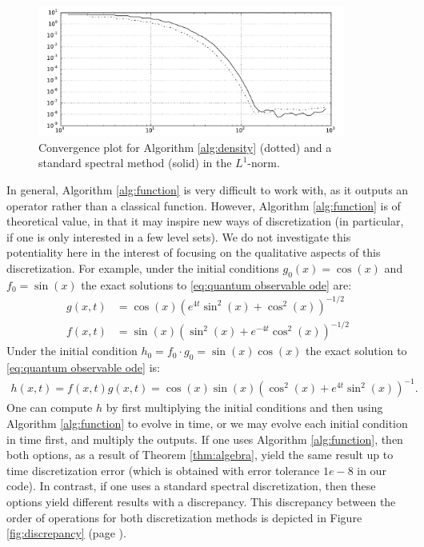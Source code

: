 \documentclass[final,leqno]{siamart}
\begin{document}
\begin{figure}[p]
	\hspace*{-1.2cm}
	\centering
	\includegraphics[width=0.9\textwidth]{./images/convergence_plot.pdf}
	\caption{Convergence plot for Algorithm \ref{alg:density} (dotted) and a standard spectral method (solid) in the $L^{1}$-norm.}
	\label{fig:convergence}
\end{figure}

In general, Algorithm \ref{alg:function} is very difficult to work with, as it outputs an operator rather than a classical function.
However, Algorithm \ref{alg:function} is of theoretical value, in that it may inspire new ways of discretization (in particular, if one is only interested in a few level sets).
We do not investigate this potentiality here in the interest of focusing on the qualitative aspects of this discretization.
For example, under the initial conditions $g_{0}(x) = \cos(x)$ and $f_{0} = \sin(x)$ the exact solutions to \eqref{eq:quantum observable ode} are:
\begin{align*}
	g(x,t) &= \cos(x) \left( e^{4t} \sin^{2}(x) + \cos^{2}(x) \right)^{-1/2}\\
	f(x,t) &= \sin(x) \left( \sin^{2}(x) + e^{-4t} \cos^{2}(x) \right)^{-1/2}
\end{align*}
Under the initial condition $h_{0} = f_{0} \cdot g_{0}  = \sin(x) \cos(x)$ the exact solution to \eqref{eq:quantum observable ode} is:
\begin{align*}
	h(x,t) = f(x,t) g(x,t) = \cos(x) \sin(x) \left( \cos^{2}(x) + e^{4t} \sin^{2}(x) \right)^{-1}.
\end{align*}
One can compute $h$ by first multiplying the initial conditions and then using Algorithm \ref{alg:function} to evolve in time, or we may evolve each initial condition in time first, and multiply the outputs.
If one uses Algorithm \ref{alg:function}, then both options, as a result of Theorem \ref{thm:algebra}, yield the same result up to time discretization error (which is obtained with error tolerance $1e-8$ in our code).
In contrast, if one uses a standard spectral discretization, then these options yield different results with a discrepancy.
This discrepancy between the order of operations for both discretization methods is depicted in Figure \ref{fig:discrepancy} (page \pageref{fig:discrepancy}).
\end{document}
